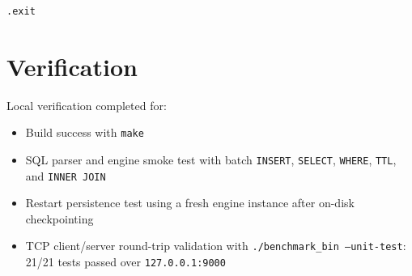 \documentclass[11pt,a4paper]{article}
\begin{document}
\begin{lstlisting}[style=commandstyle]
.exit
\end{lstlisting}

\section{Verification}

Local verification completed for:

\begin{itemize}
    \item Build success with \texttt{make}
    \item SQL parser and engine smoke test with batch \texttt{INSERT}, \texttt{SELECT}, \texttt{WHERE}, \texttt{TTL}, and \texttt{INNER JOIN}
    \item Restart persistence test using a fresh engine instance after on-disk checkpointing
    \item TCP client/server round-trip validation with \texttt{./benchmark\_bin --unit-test}: 21/21 tests passed over \texttt{127.0.0.1:9000}
\end{itemize}
\end{document}
